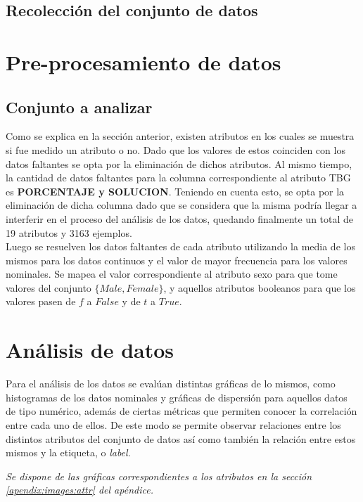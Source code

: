 \documentclass[osajnl,twocolumn,showpacs,superscriptaddress,10pt,floatfix]{revtex4-1} %
\begin{document}
\subsection{Recolección del conjunto de datos}

\section{Pre-procesamiento de datos}
\subsection{Conjunto a analizar}

Como se explica en la sección anterior, existen atributos en los cuales se muestra si fue medido un atributo o no. Dado que los valores de estos coinciden con los datos faltantes se opta por la eliminación de dichos atributos. Al mismo tiempo, la cantidad de datos faltantes para la columna correspondiente al atributo TBG es \textbf{PORCENTAJE y SOLUCION}. Teniendo en cuenta esto, se opta por la eliminación de dicha columna dado que se considera que la misma podría llegar a interferir en el proceso del análisis de los datos, quedando finalmente un total de 19 atributos y 3163 ejemplos. \\

Luego se resuelven los datos faltantes de cada atributo utilizando la media de los mismos para los datos continuos y el valor de mayor frecuencia para los valores nominales. Se mapea el valor correspondiente al atributo sexo para que tome valores del conjunto $\{Male, Female\}$, y aquellos atributos booleanos para que los valores pasen de $f$ a $False$ y de $t$ a $True$. \\

\section{Análisis de datos}

Para el análisis de los datos se evalúan distintas gráficas de lo mismos, como histogramas de los datos nominales y gráficas de dispersión para aquellos datos de tipo numérico, además de ciertas métricas que permiten conocer la correlación entre cada uno de ellos. De este modo se permite observar relaciones entre los distintos atributos del conjunto de datos así como también la relación entre estos mismos y la etiqueta, o \textit{label}.

\begin{flushright}
\textit{\footnotesize Se dispone de las gráficas correspondientes a los atributos en la sección \ref{apendix:images:attr} del apéndice.}
\end{flushright}
\end{document}
